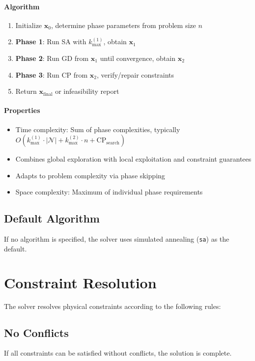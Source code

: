 \documentclass{report}
\begin{document}
\paragraph{Algorithm}
\begin{enumerate}
\item Initialize $\mathbf{x}_0$, determine phase parameters from problem size $n$
\item \textbf{Phase 1}: Run SA with $k_{\max}^{(1)}$, obtain $\mathbf{x}_1$
\item \textbf{Phase 2}: Run GD from $\mathbf{x}_1$ until convergence, obtain $\mathbf{x}_2$
\item \textbf{Phase 3}: Run CP from $\mathbf{x}_2$, verify/repair constraints
\item Return $\mathbf{x}_{\text{final}}$ or infeasibility report
\end{enumerate}

\paragraph{Properties}
\begin{itemize}
\item Time complexity: Sum of phase complexities, typically $O(k_{\max}^{(1)} \cdot |\mathcal{N}| + k_{\max}^{(2)} \cdot n + \text{CP}_{\text{search}})$
\item Combines global exploration with local exploitation and constraint guarantees
\item Adapts to problem complexity via phase skipping
\item Space complexity: Maximum of individual phase requirements
\end{itemize}

\subsection{Default Algorithm}
If no algorithm is specified, the solver uses simulated annealing (\texttt{sa}) as the default.

\section{Constraint Resolution}
The solver resolves physical constraints according to the following rules:

\subsection{No Conflicts}
If all constraints can be satisfied without conflicts, the solution is complete.
\end{document}
